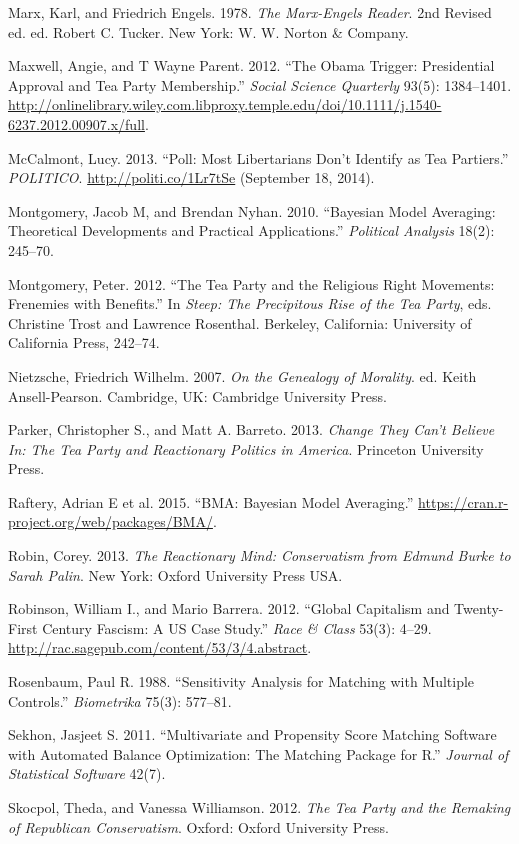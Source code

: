 \documentclass[12pt,]{article}
\begin{document}
Marx, Karl, and Friedrich Engels. 1978. \emph{The Marx-Engels Reader}.
2nd Revised ed. ed. Robert C. Tucker. New York: W. W. Norton \& Company.

Maxwell, Angie, and T Wayne Parent. 2012. ``The Obama Trigger:
Presidential Approval and Tea Party Membership.'' \emph{Social Science
Quarterly} 93(5): 1384--1401.
\url{http://onlinelibrary.wiley.com.libproxy.temple.edu/doi/10.1111/j.1540-6237.2012.00907.x/full}.

McCalmont, Lucy. 2013. ``Poll: Most Libertarians Don't Identify as Tea
Partiers.'' \emph{POLITICO}. \url{http://politi.co/1Lr7tSe} (September
18, 2014).

Montgomery, Jacob M, and Brendan Nyhan. 2010. ``Bayesian Model
Averaging: Theoretical Developments and Practical Applications.''
\emph{Political Analysis} 18(2): 245--70.

Montgomery, Peter. 2012. ``The Tea Party and the Religious Right
Movements: Frenemies with Benefits.'' In \emph{Steep: The Precipitous
Rise of the Tea Party}, eds. Christine Trost and Lawrence Rosenthal.
Berkeley, California: University of California Press, 242--74.

Nietzsche, Friedrich Wilhelm. 2007. \emph{On the Genealogy of Morality}.
ed. Keith Ansell-Pearson. Cambridge, UK: Cambridge University Press.

Parker, Christopher S., and Matt A. Barreto. 2013. \emph{Change They
Can't Believe In: The Tea Party and Reactionary Politics in America}.
Princeton University Press.

Raftery, Adrian E et al. 2015. ``BMA: Bayesian Model Averaging.''
\url{https://cran.r-project.org/web/packages/BMA/}.

Robin, Corey. 2013. \emph{The Reactionary Mind: Conservatism from Edmund
Burke to Sarah Palin}. New York: Oxford University Press USA.

Robinson, William I., and Mario Barrera. 2012. ``Global Capitalism and
Twenty-First Century Fascism: A US Case Study.'' \emph{Race \& Class}
53(3): 4--29. \url{http://rac.sagepub.com/content/53/3/4.abstract}.

Rosenbaum, Paul R. 1988. ``Sensitivity Analysis for Matching with
Multiple Controls.'' \emph{Biometrika} 75(3): 577--81.

Sekhon, Jasjeet S. 2011. ``Multivariate and Propensity Score Matching
Software with Automated Balance Optimization: The Matching Package for
R.'' \emph{Journal of Statistical Software} 42(7).

Skocpol, Theda, and Vanessa Williamson. 2012. \emph{The Tea Party and
the Remaking of Republican Conservatism}. Oxford: Oxford University
Press.
\end{document}
